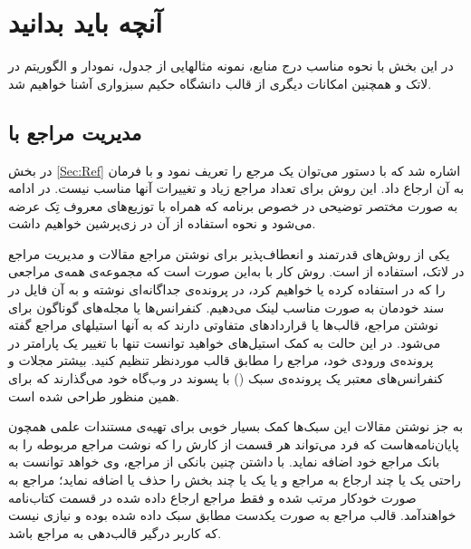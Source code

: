 %
       
\chapter{آنچه باید بدانید}\label{App:App1}

در این بخش با نحوه مناسب درج منابع، نمونه مثالهایی از جدول، نمودار و الگوریتم در لاتک و همچنین امکانات دیگری از قالب \پ دانشگاه حکیم سبزواری آشنا خواهیم شد.



\section{ مدیریت مراجع با  \texorpdfstring{}{Bib\TeX} }
در بخش \ref{Sec:Ref} اشاره شد که با دستور 
  می‌توان یک مرجع را تعریف نمود و با فرمان
  به آن ارجاع داد. این روش برای تعداد مراجع زیاد و تغییرات آنها مناسب نیست. در ادامه به صورت مختصر توضیحی در خصوص برنامه  که همراه با توزیع‌های معروف تِک عرضه می‌شود و نحوه استفاده از آن در زی‌پرشین خواهیم داشت.
  
یکی از روش‌های قدرتمند و انعطاف‌پذیر برای نوشتن مراجع مقالات و مدیریت مراجع در لاتک، استفاده از   
 است.
 روش کار با   به‌این صورت است که مجموعه‌ی همه‌ی مراجعی را که در \پ استفاده کرده یا خواهیم کرد، 
در پرونده‌ی جداگانه‌ای نوشته و به آن فایل در سند خودمان به صورت مناسب لینک می‌دهیم.
 کنفرانس‌ها یا مجله‌های گوناگون برای نوشتن مراجع، قالب‌ها یا قراردادهای متفاوتی دارند که به آنها استیلهای مراجع گفته می‌شود.
 در این حالت به کمک ‌استیل‌های  خواهید توانست تنها با تغییر یک پارامتر در پرونده‌ی ورودی خود، مراجع را مطابق قالب موردنظر تنظیم کنید. 
 بیشتر مجلات و کنفرانس‌های معتبر یک پرونده‌ی سبک () با پسوند  در وب‌گاه خود می‌گذارند که برای همین منظور طراحی شده است.

به جز نوشتن مقالات این سبک‌ها کمک بسیار خوبی برای تهیه‌ی مستندات علمی همچون پایان‌نامه‌هاست که فرد می‌تواند هر قسمت از کارش را که نوشت مراجع مربوطه را به بانک مراجع خود اضافه نماید. با داشتن چنین بانکی از مراجع، وی خواهد توانست به راحتی یک یا چند ارجاع به مراجع و یا یک یا چند بخش را حذف یا اضافه ‌نماید؛ 
مراجع به صورت خودکار مرتب شده و فقط مراجع ارجاع داده شده در قسمت کتاب‌نامه خواهندآمد. قالب مراجع به صورت یکدست مطابق سبک داده شده بوده و نیازی نیست که کاربر درگیر قالب‌دهی به مراجع باشد. 

